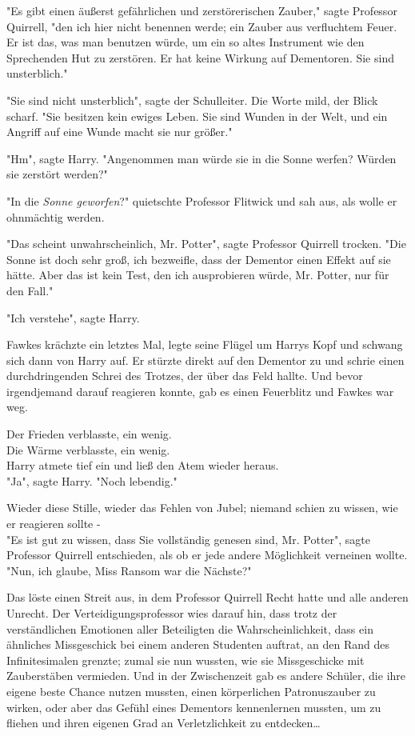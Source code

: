 {"Es gibt einen äußerst gefährlichen und zerstörerischen Zauber," sagte Professor Quirrell, "den ich hier nicht benennen werde; ein Zauber aus verfluchtem Feuer. Er ist das, was man benutzen würde, um ein so altes Instrument wie den Sprechenden Hut zu zerstören. Er hat keine Wirkung auf Dementoren. Sie sind unsterblich."

"Sie sind nicht unsterblich", sagte der Schulleiter. Die Worte mild, der Blick scharf. "Sie besitzen kein ewiges Leben. Sie sind Wunden in der Welt, und ein Angriff auf eine Wunde macht sie nur größer."

"Hm", sagte Harry. "Angenommen man würde sie in die Sonne werfen? Würden sie zerstört werden?"

"In die \emph{Sonne geworfen}?" quietschte Professor Flitwick und sah aus, als wolle er ohnmächtig werden.

"Das scheint unwahrscheinlich, Mr. Potter", sagte Professor Quirrell trocken. "Die Sonne ist doch sehr groß, ich bezweifle, dass der Dementor einen Effekt auf sie hätte. Aber das ist kein Test, den ich ausprobieren würde, Mr. Potter, nur für den Fall."

"Ich verstehe", sagte Harry.

Fawkes krächzte ein letztes Mal, legte seine Flügel um Harrys Kopf und schwang sich dann von Harry auf. Er stürzte direkt auf den Dementor zu und schrie einen durchdringenden Schrei des Trotzes, der über das Feld hallte. Und bevor irgendjemand darauf reagieren konnte, gab es einen Feuerblitz und Fawkes war weg.

Der Frieden verblasste, ein wenig.\\ Die Wärme verblasste, ein wenig.\\ Harry atmete tief ein und ließ den Atem wieder heraus.\\ "Ja", sagte Harry. "Noch lebendig."

Wieder diese Stille, wieder das Fehlen von Jubel; niemand schien zu wissen, wie er reagieren sollte -\\ "Es ist gut zu wissen, dass Sie vollständig genesen sind, Mr. Potter", sagte Professor Quirrell entschieden, als ob er jede andere Möglichkeit verneinen wollte. "Nun, ich glaube, Miss Ransom war die Nächste?"

Das löste einen Streit aus, in dem Professor Quirrell Recht hatte und alle anderen Unrecht. Der Verteidigungsprofessor wies darauf hin, dass trotz der verständlichen Emotionen aller Beteiligten die Wahrscheinlichkeit, dass ein ähnliches Missgeschick bei einem anderen Studenten auftrat, an den Rand des Infinitesimalen grenzte; zumal sie nun wussten, wie sie Missgeschicke mit Zauberstäben vermieden. Und in der Zwischenzeit gab es andere Schüler, die ihre eigene beste Chance nutzen mussten, einen körperlichen Patronuszauber zu wirken, oder aber das Gefühl eines Dementors kennenlernen mussten, um zu fliehen und ihren eigenen Grad an Verletzlichkeit zu entdecken…

}

